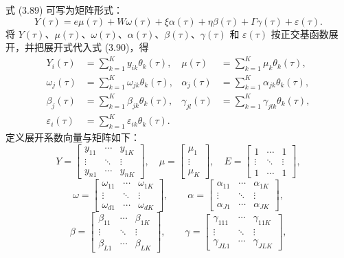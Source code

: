 式 (3.89) 可写为矩阵形式：
\begin{equation}
Y(\tau)=e\mu(\tau)+W\omega(\tau)+\xi\alpha(\tau)+\eta\beta(\tau)
+\Gamma\gamma(\tau)+\varepsilon(\tau).
\tag{3.90}
\end{equation}
将 $Y(\tau)$、$\mu(\tau)$、$\omega(\tau)$、$\alpha(\tau)$、$\beta(\tau)$、$\gamma(\tau)$ 和 $\varepsilon(\tau)$ 按正交基函数展开，并把展开式代入式 (3.90)，得
\[
\begin{aligned}
Y_i(\tau)&=\sum_{k=1}^{K}y_{ik}\theta_k(\tau),&
\mu(\tau)&=\sum_{k=1}^{K}\mu_k\theta_k(\tau),\\
\omega_j(\tau)&=\sum_{k=1}^{K}\omega_{jk}\theta_k(\tau),&
\alpha_j(\tau)&=\sum_{k=1}^{K}\alpha_{jk}\theta_k(\tau),\\
\beta_j(\tau)&=\sum_{k=1}^{K}\beta_{jk}\theta_k(\tau),&
\gamma_{jl}(\tau)&=\sum_{k=1}^{K}\gamma_{jlk}\theta_k(\tau),\\
\varepsilon_i(\tau)&=\sum_{k=1}^{K}\varepsilon_{ik}\theta_k(\tau).
\end{aligned}
\]
定义展开系数向量与矩阵如下：
\[
Y=\begin{bmatrix}y_{11}&\cdots&y_{1K}\\\vdots&\ddots&\vdots\\y_{n1}&\cdots&y_{nK}\end{bmatrix},\quad
\mu=\begin{bmatrix}\mu_1\\\vdots\\\mu_K\end{bmatrix},\quad
E=\begin{bmatrix}1&\cdots&1\\\vdots&\ddots&\vdots\\1&\cdots&1\end{bmatrix},
\]
\[
\omega=\begin{bmatrix}\omega_{11}&\cdots&\omega_{1K}\\\vdots&\ddots&\vdots\\\omega_{d1}&\cdots&\omega_{dK}\end{bmatrix},\qquad
\alpha=\begin{bmatrix}\alpha_{11}&\cdots&\alpha_{1K}\\\vdots&\ddots&\vdots\\\alpha_{J1}&\cdots&\alpha_{JK}\end{bmatrix},
\]
\[
\beta=\begin{bmatrix}\beta_{11}&\cdots&\beta_{1K}\\\vdots&\ddots&\vdots\\\beta_{L1}&\cdots&\beta_{LK}\end{bmatrix},\qquad
\gamma=\begin{bmatrix}\gamma_{111}&\cdots&\gamma_{11K}\\\vdots&\ddots&\vdots\\\gamma_{JL1}&\cdots&\gamma_{JLK}\end{bmatrix},
\]
